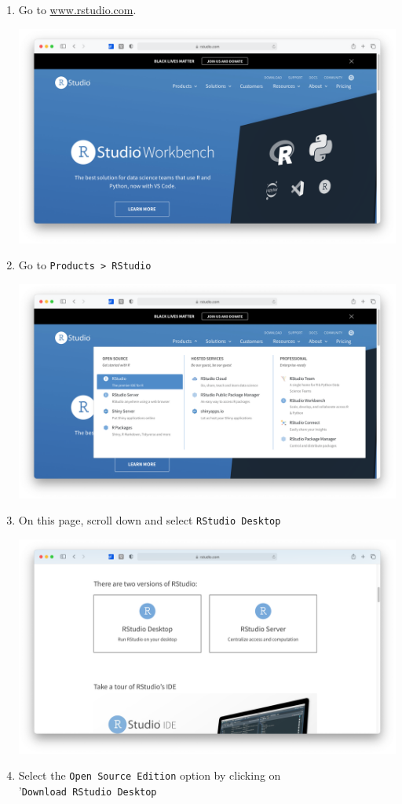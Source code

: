 \documentclass[
]{book}
\begin{document}
\begin{enumerate}
\def\labelenumi{\arabic{enumi}.}
\item
  Go to \href{https://www.rstudio.com\%5D(https://www.rstudio.com)}{www.rstudio.com}.

  \includegraphics{images/chapter_03_img/rstudio/01_rstudio_main_page.png}
\item
  Go to \texttt{Products\ \textgreater{}\ RStudio}

  \includegraphics{images/chapter_03_img/rstudio/02_rstudio_main_page_menu.png}
\item
  On this page, scroll down and select \texttt{RStudio\ Desktop}

  \includegraphics{images/chapter_03_img/rstudio/03_rstudio_select_version.png}
\item
  Select the \texttt{\textquotesingle{}Open\ Source\ Edition\textquotesingle{}} option by clicking on '\texttt{Download\ RStudio\ Desktop\textquotesingle{}}


\end{enumerate}
\end{document}
